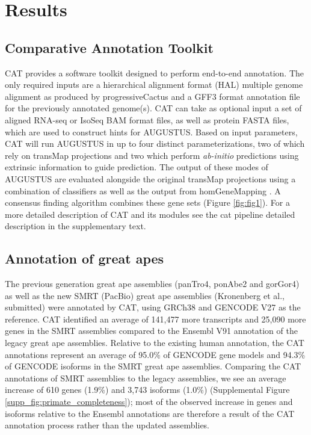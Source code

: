 \documentclass[fleqn,10pt]{wlscirep}
\begin{document}
\section*{Results}
\subsection*{Comparative Annotation Toolkit}
CAT provides a software toolkit designed to perform end-to-end annotation. The only required inputs are a hierarchical alignment format (HAL) \cite{hickey2013hal} multiple genome alignment as produced by progressiveCactus and a GFF3 format annotation file for the previously annotated genome(s). CAT can take as optional input a set of aligned RNA-seq or IsoSeq BAM format files, as well as protein FASTA files, which are used to construct hints for AUGUSTUS. Based on input parameters, CAT will run AUGUSTUS in up to four distinct parameterizations, two of which rely on transMap projections and two which perform \textit{ab-initio} predictions using extrinsic information to guide prediction. The output of these modes of AUGUSTUS are evaluated alongside the original transMap projections using a combination of classifiers as well as the output from homGeneMapping \cite{stanke2004augustus}. A consensus finding algorithm combines these gene sets (Figure \ref{fig:fig1}). For a more detailed description of CAT and its modules see the cat pipeline detailed description in the supplementary text.

\subsection*{Annotation of great apes}
The previous generation great ape assemblies (panTro4, ponAbe2 and gorGor4) as well as the new SMRT (PacBio) great ape assemblies \cite{gordon2016long} (Kronenberg et al., submitted) were annotated by CAT, using GRCh38 and GENCODE V27 as the reference. CAT identified an average of 141,477 more transcripts and 25,090 more genes in the SMRT assemblies compared to the Ensembl V91 annotation of the legacy great ape assemblies. Relative to the existing human annotation, the CAT annotations represent an average of 95.0\% of GENCODE gene models and 94.3\% of GENCODE isoforms in the SMRT great ape assemblies. Comparing the CAT annotations of SMRT assemblies to the legacy assemblies, we see an average increase of 610 genes (1.9\%) and 3,743 isoforms (1.0\%) (Supplemental Figure \ref{supp_fig:primate_completeness}); most of the observed increase in genes and isoforms relative to the Ensembl annotations are therefore a result of the CAT annotation process rather than the updated assemblies.
\end{document}
